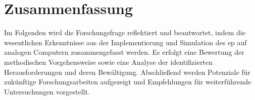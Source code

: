\newpage

\section{Zusammenfassung}

Im Folgenden wird die Forschungsfrage reflektiert und beantwortet, indem die wesentlichen Erkenntnisse aus der Implementierung und Simulation des \ac{ep} auf analogen Computern zusammengefasst werden. Es erfolgt eine Bewertung der methodischen Vorgehensweise sowie eine Analyse der identifizierten Herausforderungen und deren Bewältigung. Abschließend werden Potenziale für zukünftige Forschungsarbeiten aufgezeigt und Empfehlungen für weiterführende Untersuchungen vorgestellt.





